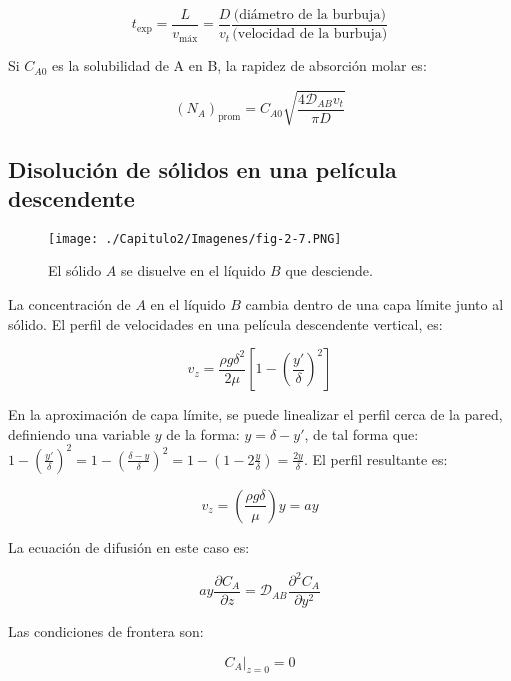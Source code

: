  $$t_{\text{exp}} = \frac{L}{v_{\text{máx}}} = \frac{D}{v_t} \frac{\text{(diámetro de la burbuja)}}{\text{(velocidad de la burbuja)}}$$
 
 Si $C_{A0}$ es la solubilidad de A en B, la rapidez de absorción molar es:
 
 \begin{equation}
 	(N_A)_{\text{prom}} = C_{A0} \sqrt{\frac{4 \mathscr{D}_{AB} v_t}{\pi D}}
 \end{equation}
 
\subsection{Disolución de sólidos en una película descendente}

\begin{figure}[H]
	\centering
	\texttt{[image: ./Capitulo2/Imagenes/fig-2-7.PNG]}
	\caption{El sólido $A$ se disuelve en el líquido $B$ que desciende.}
\end{figure}

La concentración de $A$ en el líquido $B$ cambia dentro de una capa límite junto al sólido. El perfil de velocidades en una película descendente vertical, es:

\begin{equation}
	v_z = \frac{\rho g \delta^2}{2 \mu} \left[ 1 - \left( \frac{y'}{\delta} \right)^2 \right]
\end{equation}

En la aproximación de capa límite, se puede linealizar el perfil cerca de la pared, definiendo una variable $y$ de la forma: $y = \delta - y'$, de tal forma que: $1- \left( \frac{y'}{\delta} \right)^2 = 1 - \left( \frac{\delta - y}{\delta} \right)^2 = 1 - \left( 1- 2 \frac{y}{\delta} \right) =  \frac{2y}{\delta}$.  El perfil resultante es:

\begin{equation}
	v_z = \left( \frac{\rho g \delta}{\mu} \right) y = ay
\end{equation}

La ecuación de difusión en este caso es:

\begin{equation} \label{eq: manrefx10.1}
	ay \frac{\partial C_A}{\partial z} = \mathscr{D}_{AB} \frac{\partial^2 C_A}{\partial y^2}
\end{equation}

Las condiciones de frontera son:

\begin{equation}
	C_A|_{z=0} = 0
\end{equation}


